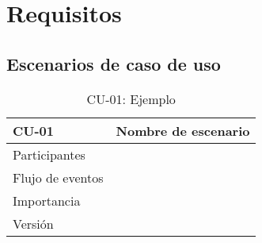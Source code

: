 \chapter{Requisitos}
\section{Escenarios de caso de uso}
\begin{table}[h]
	\centering
	\begin{tabular}{|lp{}|}
		\hline
		\rowcolor[HTML]{C0C0C0} 
		\textbf{CU-01}   & \textbf{Nombre de escenario} \\ \hline
		Participantes    &                              \\ \hline
		Flujo de eventos &                              \\ \hline
		Importancia      &                              \\ \hline
		Versión          &                              \\ \hline
	\end{tabular}
	\caption{CU-01: Ejemplo}
\end{table}

